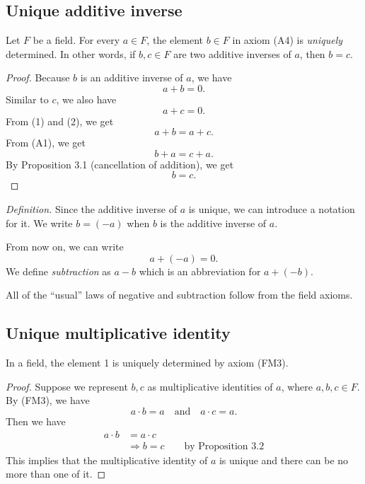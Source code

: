 \documentclass[11pt]{article}
\begin{document}
    \subsection{Unique additive inverse}

    Let $F$ be a field. For every $a \in F$, the element \(b \in F\) in axiom (A4) is \emph{uniquely} determined. In other words, if \(b,c \in F\) are two additive inverses of $a$, then $b = c$.
    \begin{proof}
        Because $b$ is an additive inverse of $a$, we have 
        \begin{equation}
            a + b = 0.
        \end{equation}
        Similar to $c$, we also have 
        \begin{equation}
            a + c = 0.
        \end{equation}
        From (1) and (2), we get \[a + b = a + c.\] From (A1), we get \[b + a = c + a.\] By Proposition 3.1 (cancellation of addition), we get \[b = c.\]
    \end{proof}
    \emph{Definition.} Since the additive inverse of $a$ is unique, we can introduce a notation for it. We write \(b = (-a)\) when $b$ is the additive inverse of $a$.

    \vspace{1em}

    From now on, we can write \[a + (-a) = 0.\] We define \emph{subtraction} as \(a - b\) which is an abbreviation for \(a + (-b)\).

    \vspace{1em}

    All of the ``usual'' laws of negative and subtraction follow from the field axioms.

    \subsection{Unique multiplicative identity}
    In a field, the element 1 is uniquely determined by axiom (FM3).
    \begin{proof}
        Suppose we represent $b,c$ as multiplicative identities of $a$, where \(a,b,c \in F\). By (FM3), we have \[a \cdot b = a \quad \text{and} \quad a \cdot c = a.\] Then we have
        \begin{align*}
            a \cdot b &= a \cdot c \\
                      &\Rightarrow b = c \qquad \text{by Proposition 3.2}
        \end{align*}
        This implies that the multiplicative identity of $a$ is unique and there can be no more than one of it.
    \end{proof}
\end{document}
